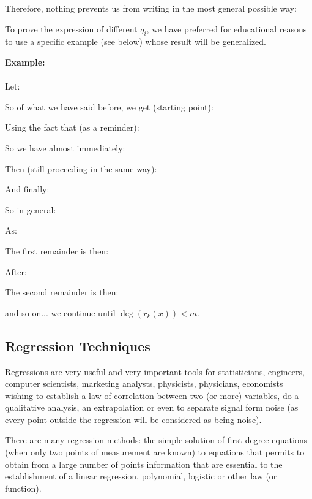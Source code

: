 	Therefore, nothing prevents us from writing in the most general possible way:
	
	To prove the expression of different $q_i$, we have preferred for educational reasons to use a specific example (see below) whose result will be generalized.
	
	\begin{tcolorbox}[colframe=black,colback=white,sharp corners]
\textbf{{\Large {}}Example:}\\\\
	Let:
	
	So of what we have said before, we get (starting point):
	
	Using the fact that (as a reminder):
	
	So we have almost immediately:
	
	Then (still proceeding in the same way):
	
	And finally:
	
	\end{tcolorbox}
	So in general:
	
	As:
	
	The first remainder is then:
	
	After:
	
	The second remainder is then:
	
	and so on... we continue until $\deg(r_k(x))<m$.	
	
	\pagebreak
	\subsection{Regression Techniques}
	Regressions are very useful and very important tools for statisticians, engineers, computer scientists, marketing analysts, physicists, physicians, economists wishing to establish a law of correlation between two (or more) variables, do a qualitative analysis, an extrapolation or even to separate signal form noise (as every point outside the regression will be considered as being noise).
	
	There are many regression  methods: the simple solution of first degree equations (when only two points of measurement are known) to equations that permits to obtain from a large number of points information that are essential to the establishment of a linear regression, polynomial, logistic or other law (or function).
	
